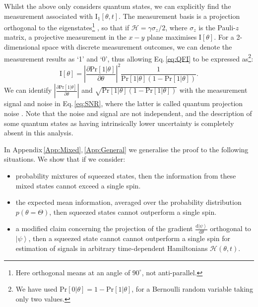 \documentclass[reqno]{amsart}
\def\be{\begin{equation}}
\def\ee{\end{equation}}
\newcommand{\ket}[1]{\left| #1 \right>}
\newcommand{\hham}{\mathcal{H}}
\def\func#1#2{\mathrm{#1}\left[#2\right]}
\def\funcwrt#1#2#3{\mathrm{#1}_{\mathrm{#3}}\left[#2\right]}
\begin{document}
Whilst the above only considers quantum states, we can explicitly find the measurement associated with $\funcwrt{I}{\theta,t}{1}$. The measurement basis is a projection orthogonal to the eigenstates\footnote{Here orthogonal means at an angle of $90^{\circ}$, not anti-parallel.} \cite{Braunstein1996, Childs2000, Giovannetti2004, Pang2017}, so that if $\hham = \gamma \sigma_z/2$, where $\sigma_z$ is the Pauli-$z$ matrix, a projective measurement in the $x-y$ plane maximises $\func{I}{\theta}$. For a 2-dimensional space with discrete measurement outcomes, we can denote the measurement results as `1' and `0', thus allowing Eq.\,\eqref{eq:QFI} to be expressed as\footnote{We have used $\func{Pr}{0|\theta} = 1 - \func{Pr}{1|\theta}$, for a Bernoulli random variable taking only two values.}:
\be
\func{I}{\theta} = \left|\frac{\partial \func{Pr}{1|\theta}}{\partial \theta}\right|^{2} \frac{1}{\func{Pr}{1|\theta}\left(1-\func{Pr}{1|\theta}\right)}.
\label{eq:prob}
\ee
We can identify $\left|\frac{\partial \func{Pr}{1|\theta}}{\partial \theta}\right|$ and $\sqrt{\func{Pr}{1|\theta}\left(1-\func{Pr}{1|\theta}\right)}$ with the measurement signal and noise in Eq.\,\eqref{eq:SNR}, where the latter is called quantum projection noise \cite{Itano1993}. Note that the noise and signal are not independent, and the description of some quantum states as having intrinsically lower uncertainty is completely absent in this analysis.

In Appendix\,\ref{App:Mixed},\,\ref{App:General} we generalise the proof to the following situations. We show that if we consider:
\begin{itemize}
\item probability mixtures of squeezed states, then the information from these mixed states cannot exceed a single spin.
\item the expected mean information, averaged over the probability distribution $p(\theta = \Theta)$, then squeezed states cannot outperform a single spin.
\item a modified claim concerning the projection of the gradient $\frac{\mathrm{d} \ket{\psi}}{\mathrm{d}\theta}$ orthogonal to $\ket{\psi}$, then a squeezed state cannot cannot outperform a single spin for estimation of signals in arbitrary time-dependent Hamiltonians $\hham(\theta, t)$.
\end{itemize}
\end{document}
